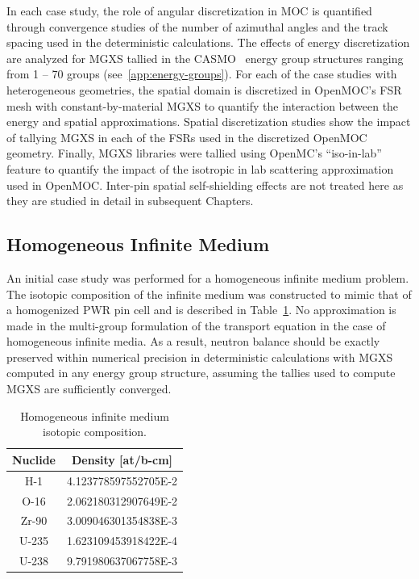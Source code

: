 In each case study, the role of angular discretization in \ac{MOC} is quantified through convergence studies of the number of azimuthal angles and the track spacing used in the deterministic calculations. The effects of energy discretization are analyzed for \ac{MGXS} tallied in the CASMO~\cite{rhodes2006casmo} energy group structures ranging from 1 -- 70 groups (see~\ref{app:energy-groups}). For each of the case studies with heterogeneous geometries, the spatial domain is discretized in OpenMOC's \ac{FSR} mesh with constant-by-material \ac{MGXS} to quantify the interaction between the energy and spatial approximations. Spatial discretization studies show the impact of tallying \ac{MGXS} in each of the \ac{FSR}s used in the discretized OpenMOC geometry. Finally, \ac{MGXS} libraries were tallied using OpenMC's ``iso-in-lab'' feature to quantify the impact of the isotropic in lab scattering approximation used in OpenMOC. Inter-pin spatial self-shielding effects are not treated here as they are studied in detail in subsequent Chapters.

\subsection{Homogeneous Infinite Medium}
\label{subsec:chap4-inf-medium}

An initial case study was performed for a homogeneous infinite medium problem. The isotopic composition of the infinite medium was constructed to mimic that of a homogenized \ac{PWR} pin cell and is described in Table~\ref{table:chap4-inf-med-isotopes}. No approximation is made in the multi-group formulation of the transport equation in the case of homogeneous infinite media. As a result, neutron balance should be exactly preserved within numerical precision in deterministic calculations with \ac{MGXS} computed in any energy group structure, assuming the tallies used to compute \ac{MGXS} are sufficiently converged.

\begin{table}[h!]
  \centering
  \caption[Infinite medium isotopic composition]{Homogeneous infinite medium isotopic composition.}
  \small
  \label{table:chap4-inf-med-isotopes} 
  \vspace{6pt}
  \begin{tabular}{c c}
  \toprule
  \multicolumn{1}{c}{\bf Nuclide} &
  \multicolumn{1}{c}{\bf Density [at/b-cm]} \\
  \midrule
  H-1 &   4.123778597552705E-2 \\
  O-16 &  2.062180312907649E-2 \\
  Zr-90 & 3.009046301354838E-3 \\
  U-235 & 1.623109453918422E-4 \\
  U-238 & 9.791980637067758E-3 \\
  \bottomrule
\end{tabular}
\end{table}

